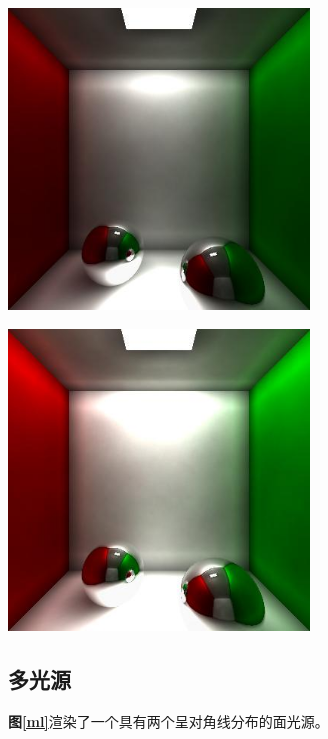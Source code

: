 \documentclass[11pt, a4paper]{article}
\makeatletter
\newcommand\fcaption{\def\@captype{figure}\caption}
\newcommand{\fref}[1]{\textbf{图\ref{#1}}}
\makeatother
\begin{document}
\begin{center}
    \includegraphics[width=8cm]{../outputs/balls_exp_0.03.jpeg}
    \fcaption{Balls (exposure=0.03)}\label{e2}
\end{center}

\begin{center}
    \includegraphics[width=8cm]{../outputs/balls_exp_0.05.jpeg}
    \fcaption{Balls (exposure=0.05)}\label{e3}
\end{center}

\subsection{多光源}

\fref{ml}渲染了一个具有两个呈对角线分布的面光源。
\end{document}

